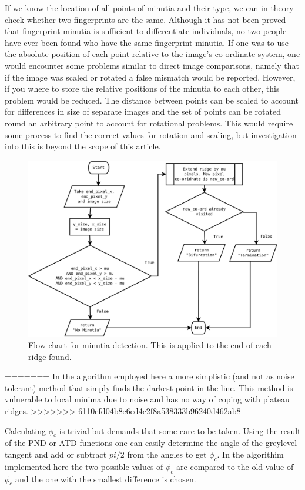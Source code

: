 \documentclass[11pt,a4paper]{article}
\begin{document}
\begin{multicols}{2}
        If we know the location of all points of minutia and their type, we can in theory check whether two fingerprints are the same. Although it has not been proved that fingerprint minutia is sufficient to differentiate individuals, no two people have ever been found who have the same fingerprint minutia. If one was to use the absolute position of each point relative to the image's co-ordinate system, one would encounter some problems similar to direct image comparisons, namely that if the image was scaled or rotated a false mismatch would be reported. However, if you where to store the relative positions of the minutia to each other, this problem would be reduced. The distance between points can be scaled to account for differences in size of separate images and the set of points can be rotated round an arbitrary point to account for rotational problems. This would require some process to find the correct values for rotation and scaling, but investigation into this is beyond the scope of this article.
        \begin{figure}
          \centering
          \includegraphics[width = \textwidth]{minutia.pdf}
          \caption{Flow chart for minutia detection. This is applied to the end of each ridge found.}
          \label{fig:min-alg}
        \end{figure}
=======
In the algorithm employed here a more simplistic (and not as noise tolerant) method that simply finds the darkest point in the line. This method is vulnerable to local minima due to noise and has no way of coping with plateau ridges.
>>>>>>> 6110efd04b8e6ed4c2f8a538333b96240d462ab8

		Calculating $\phi_c$ is trivial but demands that some care to be taken. Using the result of the PND or ATD functions one can easily determine the angle of the greylevel tangent and add or subtract $pi/2$ from the angles to get $\phi_c$. In the algorithim implemented here the two possible values of $\phi_c$ are compared to the old value of $\phi_c$ and the one with the smallest difference is chosen.


\end{multicols}
\end{document}
